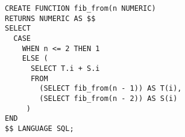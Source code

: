\begin{verbatim}
CREATE FUNCTION fib_from(n NUMERIC)
RETURNS NUMERIC AS $$
SELECT
  CASE
    WHEN n <= 2 THEN 1
    ELSE (
      SELECT T.i + S.i
      FROM
        (SELECT fib_from(n - 1)) AS T(i),
        (SELECT fib_from(n - 2)) AS S(i)
     )
END
$$ LANGUAGE SQL;
\end{verbatim}